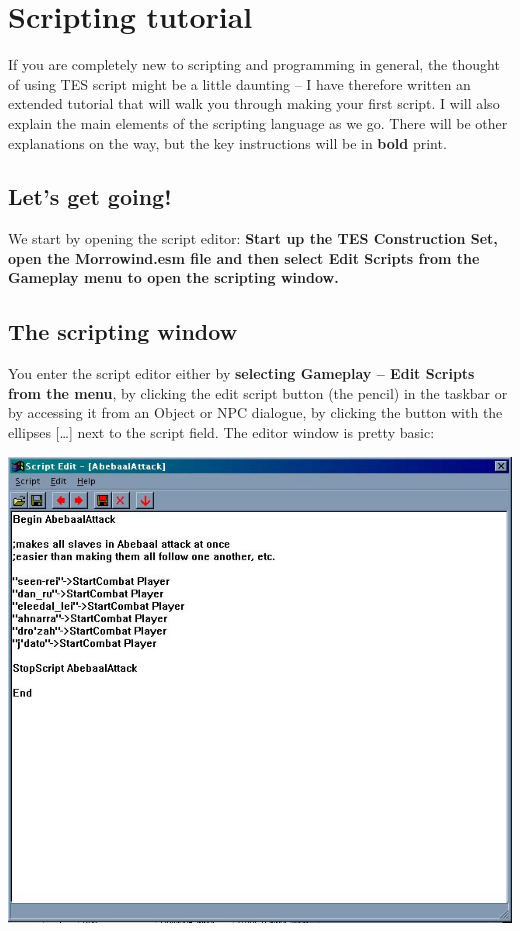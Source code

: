 \section{Scripting tutorial}

If you are completely new to scripting and programming in general, the thought of using TES script might be a little daunting -- I have therefore written an extended tutorial that will walk you through making your first script. I will also explain the main elements of the scripting language as we go. There will be other explanations on the way, but the key instructions will be in \textbf{bold} print.

\hypertarget{lets-get-going}{%
\subsection{Let's get going!}\label{lets-get-going}}

We start by opening the script editor: \textbf{Start up the TES Construction Set, open the Morrowind.esm file and then select Edit Scripts from the Gameplay menu to open the scripting window.}

\hypertarget{the-scripting-window}{%
\subsection{The scripting window}\label{the-scripting-window}}

You enter the script editor either by \textbf{selecting Gameplay -- Edit Scripts from the menu}, by clicking the edit script button (the pencil) in the taskbar or by accessing it from an Object or NPC dialogue, by clicking the button with the ellipses {[}\ldots{]} next to the script field. The editor window is pretty basic:

\includegraphics{media/image2.jpg}

